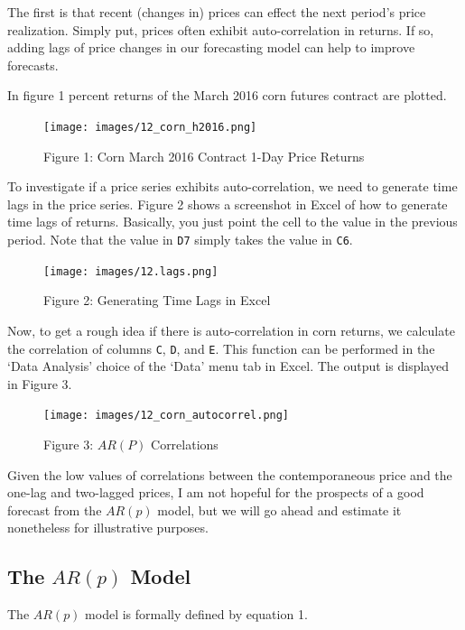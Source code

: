 \documentclass[
]{book}
\begin{document}
The first is that recent (changes in) prices can effect the next period's price realization. Simply put, prices often exhibit auto-correlation in returns. If so, adding lags of price changes in our forecasting model can help to improve forecasts.

In figure 1 percent returns of the March 2016 corn futures contract are plotted.

\begin{figure}
\centering
\texttt{[image: images/12\_corn\_h2016.png]}
\caption{Figure 1: Corn March 2016 Contract 1-Day Price Returns}
\end{figure}

To investigate if a price series exhibits auto-correlation, we need to generate time lags in the price series. Figure 2 shows a screenshot in Excel of how to generate time lags of returns. Basically, you just point the cell to the value in the previous period. Note that the value in \texttt{D7} simply takes the value in \texttt{C6}.

\begin{figure}
\centering
\texttt{[image: images/12.lags.png]}
\caption{Figure 2: Generating Time Lags in Excel}
\end{figure}

Now, to get a rough idea if there is auto-correlation in corn returns, we calculate the correlation of columns \texttt{C}, \texttt{D}, and \texttt{E}. This function can be performed in the `Data Analysis' choice of the `Data' menu tab in Excel. The output is displayed in Figure 3.

\begin{figure}
\centering
\texttt{[image: images/12\_corn\_autocorrel.png]}
\caption{Figure 3: \(AR(P)\) Correlations}
\end{figure}

Given the low values of correlations between the contemporaneous price and the one-lag and two-lagged prices, I am not hopeful for the prospects of a good forecast from the \(AR(p)\) model, but we will go ahead and estimate it nonetheless for illustrative purposes.

\hypertarget{the-arp-model}{%
\subsection{\texorpdfstring{The \(AR(p)\) Model}{The AR(p) Model}}\label{the-arp-model}}

The \(AR(p)\) model is formally defined by equation 1.
\end{document}
